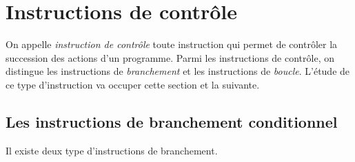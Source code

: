 \section{Instructions de contr\^ole}
\label{sec:InstructionsDeControle}
On appelle \textit{instruction de   contr\^ole} toute instruction  qui
permet de contr\^oler la succession des actions d'un programme.  Parmi
les instructions   de  contr\^ole, on  distingue  les  instructions de
\textit{branchement} et les instructions de \textit{boucle}. L'\'etude
de ce type d'instruction va occuper cette section et la suivante.
\subsection{Les instructions de branchement conditionnel}
\label{sec:BranchementConditionnel}   
Il existe deux type d'instructions de branchement.
